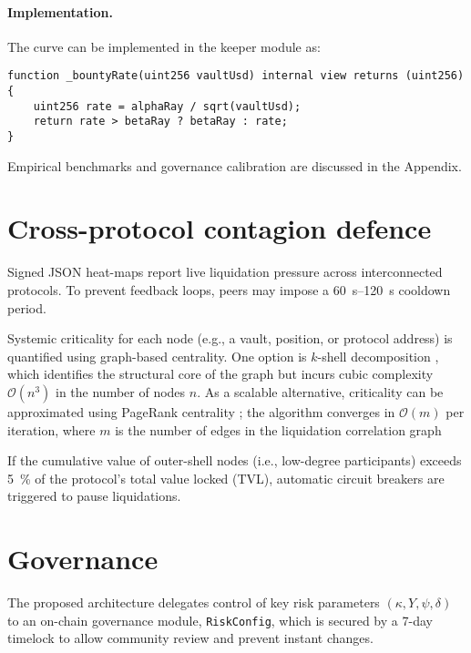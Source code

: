 \documentclass[11pt]{article}
\begin{document}
\paragraph{Implementation.} The curve can be implemented in the keeper module as:

\begin{lstlisting}[caption={Reward curve for vault liquidations}]
function _bountyRate(uint256 vaultUsd) internal view returns (uint256) {
    uint256 rate = alphaRay / sqrt(vaultUsd);
    return rate > betaRay ? betaRay : rate;
}
\end{lstlisting}

Empirical benchmarks and governance calibration are discussed in the Appendix.


\section{Cross-protocol contagion defence}
\label{sec:contagion}
Signed JSON heat-maps report live liquidation pressure across interconnected protocols.  To prevent feedback loops, peers may impose a \SIrange{60}{120}{\second} cooldown period.  

Systemic criticality for each node (e.g., a vault, position, or protocol address) is quantified using graph-based centrality.  
One option is $k$-shell decomposition \parencite{battiston2012debtrank}, which identifies the structural core of the graph but incurs cubic complexity $\mathcal{O}(n^3)$ in the number of nodes $n$.  
As a scalable alternative, criticality can be approximated using PageRank centrality \parencite{page1999pagerank}; the algorithm converges in $\mathcal{O}(m)$ per iteration, where $m$ is the number of edges in the liquidation correlation graph

If the cumulative value of outer-shell nodes (i.e., low-degree participants) exceeds \SI{5}{\percent} of the protocol’s total value locked (TVL), automatic circuit breakers are triggered to pause liquidations.

\section{Governance}
\label{sec:governance}
The proposed architecture delegates control of key risk parameters \((\kappa, Y, \psi, \delta)\) to an on-chain governance module, \texttt{RiskConfig}, which is secured by a 7-day timelock to allow community review and prevent instant changes.
\end{document}
